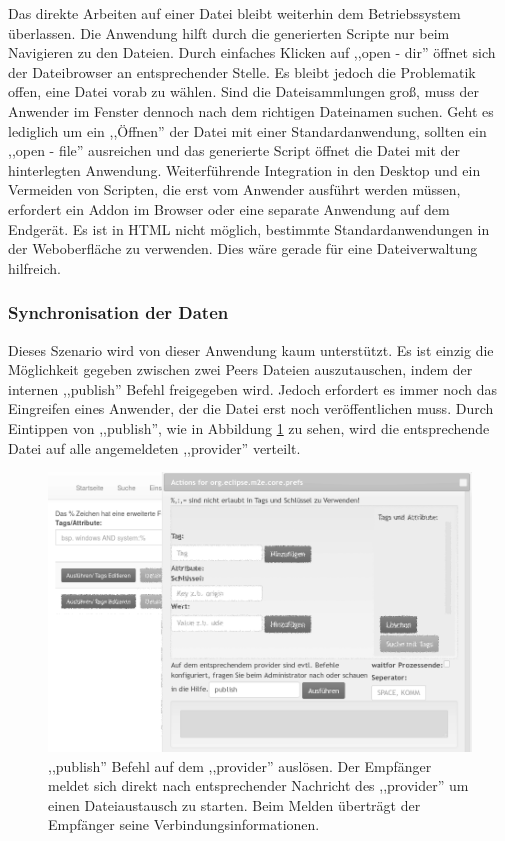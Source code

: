 \documentclass[oneside, ngerman, toc=bibliography,bibliography=totoc,listof=entryprefix, open=right,numbers=noenddot,fontsize=12pt]{scrbook}
\begin{document}
Das direkte Arbeiten auf einer Datei bleibt weiterhin dem Betriebssystem überlassen. Die Anwendung hilft durch die generierten Scripte nur beim Navigieren zu den Dateien. Durch einfaches Klicken auf ,,open - dir'' öffnet sich der Dateibrowser an entsprechender Stelle. Es bleibt jedoch die Problematik offen, eine Datei vorab zu wählen. Sind die Dateisammlungen groß, muss der Anwender im Fenster dennoch nach dem richtigen Dateinamen suchen. Geht es lediglich um ein ,,Öffnen'' der Datei mit einer Standardanwendung, sollten ein ,,open - file'' ausreichen und das generierte Script öffnet die Datei mit der hinterlegten Anwendung.
Weiterführende Integration in den Desktop und ein Vermeiden von Scripten, die erst vom Anwender ausführt werden müssen, erfordert ein Addon im Browser oder eine separate Anwendung auf dem Endgerät. Es ist in HTML nicht möglich, bestimmte Standardanwendungen in der Weboberfläche zu verwenden. Dies wäre gerade für eine Dateiverwaltung hilfreich.

 
\subsubsection{Synchronisation der Daten}
Dieses Szenario wird von dieser Anwendung kaum unterstützt. Es ist einzig die Möglichkeit gegeben zwischen zwei Peers Dateien auszutauschen, indem der internen ,,publish'' Befehl freigegeben wird. Jedoch erfordert es immer noch das Eingreifen eines Anwender, der die Datei erst noch veröffentlichen muss. Durch Eintippen von ,,publish'', wie in Abbildung \ref{fig:www-cmd-pub} zu sehen, wird die entsprechende Datei auf alle angemeldeten ,,provider'' verteilt.

\begin{figure}[htbp] 
    \centering
    \includegraphics[width=\textwidth]{Masterarbeit_Bilder/www_cmd_publish.png}
    \caption{ ,,publish'' Befehl auf dem ,,provider'' auslösen. Der Empfänger meldet sich direkt nach entsprechender Nachricht des  ,,provider'' um einen Dateiaustausch zu starten. Beim Melden überträgt der Empfänger seine Verbindungsinformationen.}
    \label{fig:www-cmd-pub}
\end{figure}  
\end{document}

